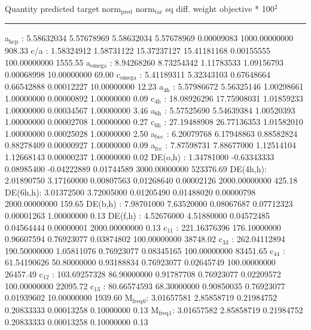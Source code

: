 \documentclass[11pt]{article}
\begin{document}
Quantity      predicted    target     norm\(_{\text{pred}}\)   norm\(_{\text{tar}}\)    sq diff.      weight    objective * 100\(^{\text{2}}\) 

\noindent\rule{\textwidth}{0.5pt}
a\(_{\text{hcp}}\)   :   5.58632034   5.57678969   5.58632034   5.57678969   0.00009083 1000.00000000       908.33
c/a     :   1.58324912   1.58731122  15.37237127  15.41181168   0.00155555 100.00000000      1555.55
a\(_{\text{omega}}\) :   8.94268260   8.73254342   1.11783533   1.09156793   0.00068998  10.00000000        69.00
c\(_{\text{omega}}\) :   5.41189311   5.32343103   0.67648664   0.66542888   0.00012227  10.00000000        12.23
a\(_{\text{4h}}\)    :   5.57986672   5.56325146   1.00298661   1.00000000   0.00000892   1.00000000         0.09
c\(_{\text{4h}}\)    :  18.08926296  17.75908031   1.01859233   1.00000000   0.00034567   1.00000000         3.46
a\(_{\text{6h}}\)    :   5.57525690   5.54639384   1.00520393   1.00000000   0.00002708   1.00000000         0.27
c\(_{\text{6h}}\)    :  27.19488908  26.77136353   1.01582010   1.00000000   0.00025028   1.00000000         2.50
a\(_{\text{bcc}}\)   :   6.20079768   6.17948863   0.88582824   0.88278409   0.00000927   1.00000000         0.09
a\(_{\text{fcc}}\)   :   7.87598731   7.88677000   1.12514104   1.12668143   0.00000237   1.00000000         0.02
DE(o,h) :   1.34781000  -0.63343333   0.08985400  -0.04222889   0.01744589 3000.00000000    523376.69
DE(4h,h):   2.01890750   3.17160000   0.00807563   0.01268640   0.00002126 2000.00000000       425.18
DE(6h,h):   3.01372500   3.72005000   0.01205490   0.01488020   0.00000798 2000.00000000       159.65
DE(b,h) :   7.98701000   7.63520000   0.08067687   0.07712323   0.00001263   1.00000000         0.13
DE(f,h) :   4.52676000   4.51880000   0.04572485   0.04564444   0.00000001 2000.00000000         0.13
c\(_{\text{11}}\)    : 221.16376396 176.10000000   0.96607594   0.76923077   0.03874802 100.00000000     38748.02
c\(_{\text{33}}\)    : 262.04112894 190.50000000   1.05811076   0.76923077   0.08345165 100.00000000     83451.65
c\(_{\text{44}}\)    :  61.54190626  50.80000000   0.93188834   0.76923077   0.02645749 100.00000000     26457.49
c\(_{\text{12}}\)    : 103.69257328  86.90000000   0.91787708   0.76923077   0.02209572 100.00000000     22095.72
c\(_{\text{13}}\)    :  80.66574593  68.30000000   0.90850035   0.76923077   0.01939602  10.00000000      1939.60
M\(_{\text{freq}}\)\(_{\text{0}}\):   3.01657581   2.85858719   0.21984752   0.20833333   0.00013258   0.10000000         0.13
M\(_{\text{freq}}\)\(_{\text{1}}\):   3.01657582   2.85858719   0.21984752   0.20833333   0.00013258   0.10000000         0.13
\end{document}
